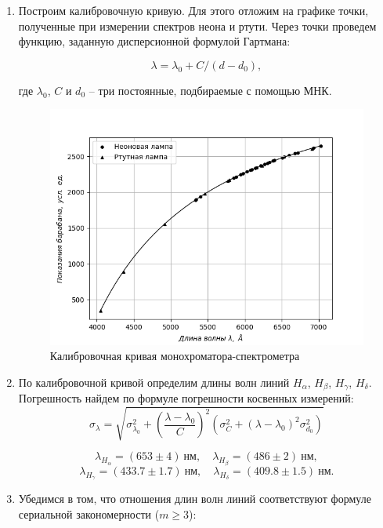 \documentclass[14pt, a4paper]{report}
\begin{document}
\begin{enumerate}

\setcounter{enumi}{0}

\item Построим калибровочную кривую. Для этого отложим на графике точки, полученные при измерении спектров неона и ртути. Через точки проведем функцию, заданную дисперсионной формулой Гартмана:

\[\lambda=\lambda_0+C/(d-d_0),\]

где $\lambda_0$, $C$ и $d_0$ -- три постоянные, подбираемые с помощью МНК.

\begin{figure}[H]
\centering
\includegraphics[scale=0.6]{../images/523-1}
\caption{Калибровочная кривая монохроматора-спектрометра}
\end{figure}

\item По калибровочной кривой определим длины волн линий $H_\alpha$, $H_\beta$, $H_\gamma$, $H_\delta$.
Погрешность найдем по формуле погрешности косвенных измерений:
\[\sigma_\lambda=\sqrt{\sigma_{\lambda_0}^2+\left(\frac{\lambda-\lambda_0}{C}\right)^2\left(\sigma_C^2+(\lambda-\lambda_0)^2\sigma_{d_0}^2\right)}\]

\[\lambda_{H_\alpha}=(653\pm4)\ нм,\quad\lambda_{H_\beta}=(486\pm2)\ нм,\]
\[\lambda_{H_\gamma}=(433.7\pm1.7)\ нм,\quad\lambda_{H_\delta}=(409.8\pm1.5)\ нм.\]

\item Убедимся в том, что отношения длин волн линий соответствуют формуле сериальной закономерности ($m\ge3$):


\end{enumerate}
\end{document}
